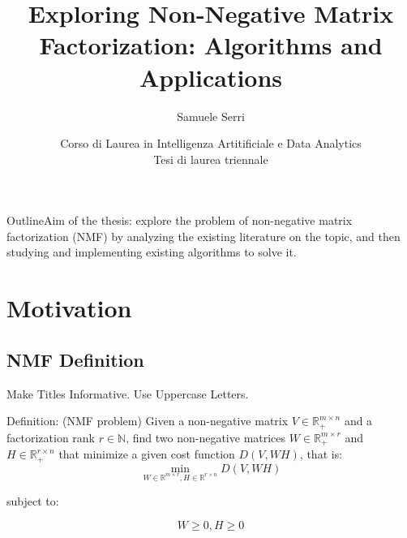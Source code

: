 \documentclass{beamer}
\title[Short Paper Title] %
{Exploring Non-Negative Matrix Factorization: Algorithms and Applications}
\subtitle
{}
\author[Author] %
{Samuele Serri}
\institute[Università degli studi di Trieste] %
{
  
  Dipartimento di Matematica Informatica e Geoscienze -- MIGE\\
  Università degli studi di Trieste
}
\date[26/03/2026] %
{Corso di Laurea in Intelligenza Artitificiale e Data Analytics \\
\vfill %
\large
{Tesi di laurea triennale}\\}
\newcommand{\R}{\mathbb{R}}
\newcommand{\N}{\mathbb{N}}
\begin{document}
\begin{frame}
  \titlepage
\end{frame}

\begin{frame}{Outline}{Aim of the thesis: explore the problem of non-negative matrix factorization (NMF) by analyzing
the existing literature on the topic, and then studying and implementing existing
algorithms to solve it.}
  \tableofcontents
\end{frame}





\section{Motivation}

\subsection{NMF Definition}

\begin{frame}{Make Titles Informative. Use Uppercase Letters.}
\begin{block}{Definition: (NMF problem)}
Given a non-negative matrix $V \in \R_+^{m \times n}$ and a factorization rank $r \in \N$, find two non-negative matrices $W \in \R_+^{m \times r}$ and $H \in \R_+^{r \times n}$ that minimize 
a given cost function $D(V, WH)$, that is:
\begin{equation}
\min_{W \in \R^{m \times r}, H \in \R^{r \times n}} D(V, WH)
\end{equation}
\begin{center}
  subject to:
\end{center}
\begin{equation*}
W \geq 0, H \geq 0
\end{equation*}
\end{block}
\end{frame}
\end{document}
